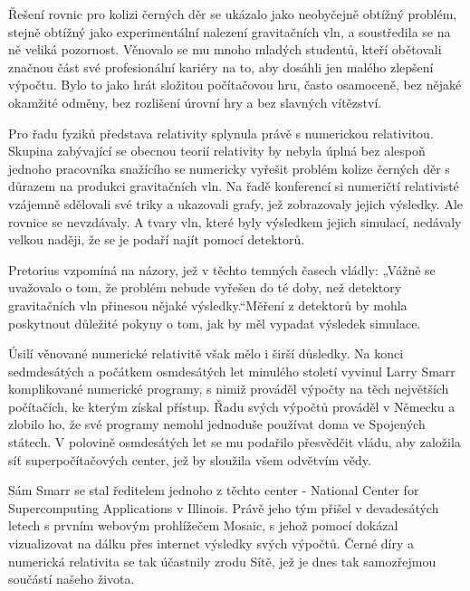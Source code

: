   Řešení rovnic pro kolizi černých děr se ukázalo jako neobyčejně obtížný problém, stejně obtížný
  jako experimentální nalezení gravitačních vln, a soustředila se na ně veliká pozornost. Věnovalo
  se mu mnoho mladých studentů, kteří obětovali značnou část své profesionální kariéry na to, aby
  dosáhli jen malého zlepšení výpočtu. Bylo to jako hrát složitou počítačovou hru, často osamoceně,
  bez nějaké okamžité odměny, bez rozlišení úrovní hry a bez slavných vítězství. 

  Pro řadu fyziků představa relativity splynula právě s numerickou relativitou. Skupina zabývající
  se obecnou teorií relativity by nebyla úplná bez alespoň jednoho pracovníka snažícího se numericky
  vyřešit problém kolize černých děr s důrazem na produkci gravitačních vln. Na řadě konferencí si
  numeričtí relativisté vzájemně sdělovali své triky a ukazovali grafy, jež zobrazovaly jejich
  výsledky. Ale rovnice se nevzdávaly. A tvary vln, které byly výsledkem jejich simulací, nedávaly
  velkou naději, že se je podaří najít pomocí detektorů. 

  Pretorius vzpomíná na názory, jež v těchto temných časech vládly: „Vážně se uvažovalo o tom, že
  problém nebude vyřešen do té doby, než detektory gravitačních vln přinesou nějaké výsledky.“Měření
  z detektorů by mohla poskytnout důležité pokyny o tom, jak by měl vypadat výsledek simulace. 

  Úsilí věnované numerické relativitě však mělo i širší důsledky. Na konci sedmdesátých a počátkem
  osmdesátých let minulého století vyvinul Larry Smarr komplikované numerické programy, s nimiž
  prováděl výpočty na těch největších počítačích, ke kterým získal přístup. Řadu svých výpočtů
  prováděl v Německu a zlobilo ho, že své programy nemohl jednoduše používat doma ve Spojených
  státech. V polovině osmdesátých let se mu podařilo přesvědčit vládu, aby založila síť
  superpočítačových center, jež by sloužila všem odvětvím vědy. 

  Sám Smarr se stal ředitelem jednoho z těchto center - National Center for Supercomputing
  Applications v Illinois. Právě jeho tým přišel v devadesátých letech s prvním webovým prohlížečem
  Mosaic, s jehož pomocí dokázal vizualizovat na dálku přes internet výsledky svých výpočtů. Černé
  díry a numerická relativita se tak účastnily zrodu Sítě, jež je dnes tak samozřejmou součástí
  našeho života. 

